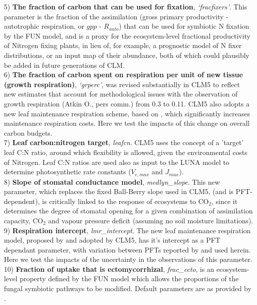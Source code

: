 \documentclass[draft,linenumbers]{agujournal}
\begin{document}
5) \textbf{The fraction of carbon that can be used for fixation}, \emph{`fracfixers'}. This parameter is the fraction of the assimilation (gross primary productivity - autotrophic respiration, or $gpp$ - $R_{auto}$) that can be used for symbiotic N fixation by the FUN model, and is a proxy for the ecosystem-level fractional productivity of Nitrogen fixing plants, in lieu of, for example, a prognostic model of N fixer distributions, or an input map of their abundance, both of which could plausibly be added in future generations of CLM. \\

6) \textbf{The fraction of carbon spent on respiration per unit of new tissue (growth respiration)}, \emph{`grperc'}, was revised substantially in CLM5 to reflect new estimates that account for methodological issues with the observation of growth respiration (Atkin O., pers comm.) from 0.3 to 0.11. CLM5 also adopts a new leaf maintenance respiration scheme, based on \cite{atkin2015}, which significantly increases maintenance respiration costs. Here we test the impacts of this change on overall carbon budgets.\\

7) \textbf{Leaf carbon:nitrogen target}, \emph{leafcn}. CLM5 uses the concept of a 'target' leaf C:N ratio, around which flexibility is allowed, given the environmental costs of Nitrogen. Leaf C:N ratios are used also as input to the LUNA model to determine photosynthetic rate constants ($V_{c,max}$ and $J_{max}$). \\

8) \textbf{Slope of stomatal conductance model}, \emph{medlyn\_slope}. This new parameter, which replaces the fixed Ball-Berry slope used in CLM5, (and is PFT-dependent), is critically linked to the response of ecosystems to CO$_{2}$, since it determines the degree of stomatal opening for a given combination of assimilation capacity, CO$_{2}$ and vapour pressure deficit (assuming no soil moisture limitations).\\

9) \textbf{Respiration intercept}, \emph{lmr\_intercept}. The new leaf maintenance respiration model, proposed by \cite{atkin2015} and adopted by CLM5, has it's intercept as a PFT dependant parameter, with variation between PFTs reported by \cite{atkin2015} and used herein. Here we test the impacts of the uncertainty in the observations of this parameter. \\

10) \textbf{Fraction of uptake that is ectomycorrhizal}, \emph{frac\_ecto}, is an ecosystem-level property defined by the FUN model which allows the proportions of the fungal symbiotic pathways to be modified. Default parameters are as provided by \cite{shi2016}.\\
\end{document}
